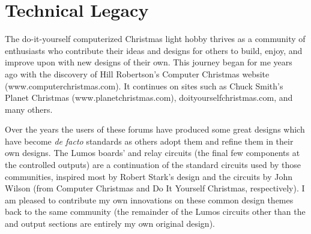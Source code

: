 \section*{Technical Legacy}\label{sec:legacy}
The do-it-yourself computerized Christmas light hobby thrives as a community of enthusiasts
who contribute their ideas and designs for others to build, enjoy, and improve upon with new
designs of their own.  
This journey began for me years ago with the discovery of Hill Robertson's Computer Christmas
website ({\ttfamily www.computerchristmas.com}).  It continues on sites such as 
Chuck Smith's Planet Christmas ({\ttfamily www.planetchrist\-mas\-.com}), 
{\ttfamily doityourselfchristmas.com}, and many others.  

Over the years the users of these forums have produced some great designs which have become
\emph{de facto} standards as others adopt them and refine them in their own designs.  The Lumos
boards'  and  relay circuits (the final few components at the controlled
outputs) are a continuation of the standard circuits used by those communities, inspired most
by Robert Stark's  design and the   circuits by John Wilson (from Computer
Christmas and Do It Yourself Christmas, respectively).  I am pleased to contribute my own
innovations on these common design themes back to the same community (the remainder of the
Lumos circuits other than the  and  output sections are entirely
my own original design).
